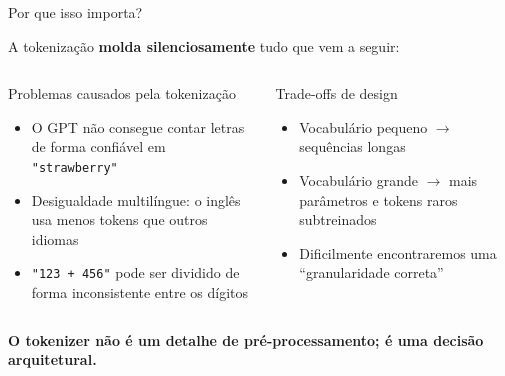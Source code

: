 \documentclass[aspectratio=169,xcolor=dvipsnames]{beamer}
\begin{document}

\begin{frame}{Por que isso importa?}

A tokenização \textbf{molda silenciosamente} tudo que vem a seguir:

\vspace{8pt}

\begin{columns}[T]
\begin{alertblock}{Problemas causados pela tokenização}
\begin{itemize}
    \item O GPT não consegue contar letras de forma confiável em \texttt{"strawberry"}
    \item Desigualdade multilíngue: o inglês usa menos tokens que outros idiomas
    \item \texttt{"123 + 456"} pode ser dividido de forma inconsistente entre os dígitos
\end{itemize}
\end{alertblock}

\begin{exampleblock}{Trade-offs de design}
\begin{itemize}
    \item Vocabulário pequeno $\rightarrow$ sequências longas
    \item Vocabulário grande $\rightarrow$ mais parâmetros e tokens raros subtreinados
    \item Dificilmente encontraremos uma ``granularidade correta''
\end{itemize}
\end{exampleblock}
\end{columns}

\vspace{8pt}
\centering
\textbf{O tokenizer não é um detalhe de pré-processamento; é uma decisão arquitetural.}

\end{frame}

\end{document}
